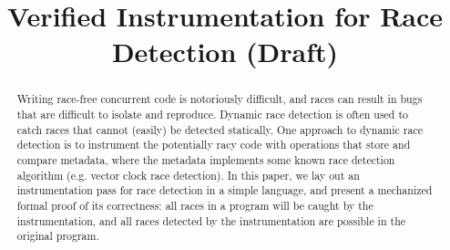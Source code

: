 \documentclass[preprint, 10pt]{sigplanconf}
\newcommand{\ignore}[1]{}
\begin{document}
\setlength{\pdfpageheight}{\paperheight}
\setlength{\pdfpagewidth}{\paperwidth}






\title{Verified Instrumentation for Race Detection (Draft)}
\ignore{\authorinfo{William Mansky \and Yuanfeng Peng \and Steve Zdancewic \and Joe Devietti}
           {University of Pennsylvania}
           {wmansky@seas.upenn.edu, yuanfeng@cis.upenn.edu, stevez@cis.upenn.edu, devietti@cis.upenn.edu}}
\authorinfo{}{}{}
\maketitle

\begin{abstract}
Writing race-free concurrent code is notoriously difficult, and races can result in bugs that are difficult to isolate and reproduce. Dynamic race detection is often used to catch races that cannot (easily) be detected statically. One approach to dynamic race detection is to instrument the potentially racy code with operations that store and compare metadata, where the metadata implements some known race detection algorithm (e.g. vector clock race detection). In this paper, we lay out an instrumentation pass for race detection in a simple language, and present a mechanized formal proof of its correctness: all races in a program will be caught by the instrumentation, and all races detected by the instrumentation are possible in the original program.
\end{abstract}

\end{document}
